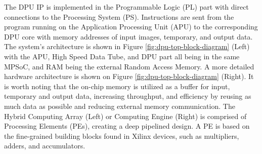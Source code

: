 The DPU IP is implemented in the Programmable Logic (PL) part with direct connections to the Processing System (PS). Instructions are sent from the program running on the Application Processing Unit (APU) to the corresponding DPU core with memory addresses of input images, temporary, and output data. The system's architecture is shown in Figure \ref{fig:dpu-top-block-diagram} (Left) with the APU, High Speed Data Tube, and DPU part all being in the same MPSoC, and RAM being the external Random Access Memory. A more detailed hardware architecture is shown on Figure \ref{fig:dpu-top-block-diagram} (Right). It is worth noting that the on-chip memory is utilized as a buffer for input, temporary and output data, increasing throughput, and efficiency by reusing as much data as possible and reducing external memory communication. The Hybrid Computing Array (Left) or Computing Engine (Right) is comprised of Processing Elements (PEs), creating a deep pipelined design. A PE is based on the fine-grained building blocks found in Xilinx devices, such as multipliers, adders, and accumulators.

